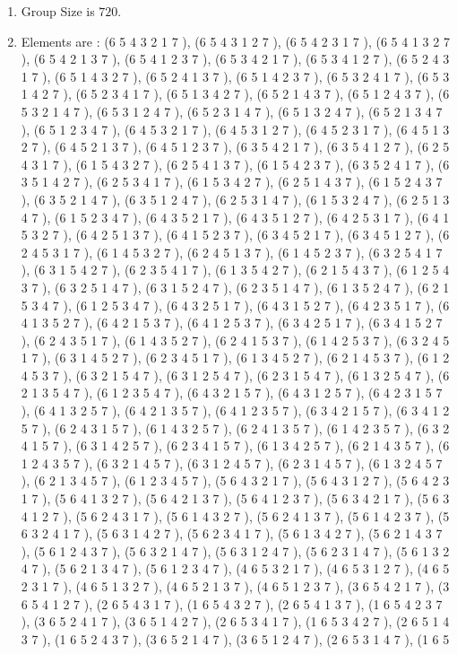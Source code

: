 \documentclass[12pt]{article}
\begin{document}
\begin{enumerate}
\item Group Size is $720$.
\item Elements are : (6 5 4 3 2 1 7  ), (6 5 4 3 1 2 7  ), (6 5 4 2 3 1 7  ), (6 5 4 1 3 2 7  ), (6 5 4 2 1 3 7  ), (6 5 4 1 2 3 7  ), (6 5 3 4 2 1 7  ), (6 5 3 4 1 2 7  ), (6 5 2 4 3 1 7  ), (6 5 1 4 3 2 7  ), (6 5 2 4 1 3 7  ), (6 5 1 4 2 3 7  ), (6 5 3 2 4 1 7  ), (6 5 3 1 4 2 7  ), (6 5 2 3 4 1 7  ), (6 5 1 3 4 2 7  ), (6 5 2 1 4 3 7  ), (6 5 1 2 4 3 7  ), (6 5 3 2 1 4 7  ), (6 5 3 1 2 4 7  ), (6 5 2 3 1 4 7  ), (6 5 1 3 2 4 7  ), (6 5 2 1 3 4 7  ), (6 5 1 2 3 4 7  ), (6 4 5 3 2 1 7  ), (6 4 5 3 1 2 7  ), (6 4 5 2 3 1 7  ), (6 4 5 1 3 2 7  ), (6 4 5 2 1 3 7  ), (6 4 5 1 2 3 7  ), (6 3 5 4 2 1 7  ), (6 3 5 4 1 2 7  ), (6 2 5 4 3 1 7  ), (6 1 5 4 3 2 7  ), (6 2 5 4 1 3 7  ), (6 1 5 4 2 3 7  ), (6 3 5 2 4 1 7  ), (6 3 5 1 4 2 7  ), (6 2 5 3 4 1 7  ), (6 1 5 3 4 2 7  ), (6 2 5 1 4 3 7  ), (6 1 5 2 4 3 7  ), (6 3 5 2 1 4 7  ), (6 3 5 1 2 4 7  ), (6 2 5 3 1 4 7  ), (6 1 5 3 2 4 7  ), (6 2 5 1 3 4 7  ), (6 1 5 2 3 4 7  ), (6 4 3 5 2 1 7  ), (6 4 3 5 1 2 7  ), (6 4 2 5 3 1 7  ), (6 4 1 5 3 2 7  ), (6 4 2 5 1 3 7  ), (6 4 1 5 2 3 7  ), (6 3 4 5 2 1 7  ), (6 3 4 5 1 2 7  ), (6 2 4 5 3 1 7  ), (6 1 4 5 3 2 7  ), (6 2 4 5 1 3 7  ), (6 1 4 5 2 3 7  ), (6 3 2 5 4 1 7  ), (6 3 1 5 4 2 7  ), (6 2 3 5 4 1 7  ), (6 1 3 5 4 2 7  ), (6 2 1 5 4 3 7  ), (6 1 2 5 4 3 7  ), (6 3 2 5 1 4 7  ), (6 3 1 5 2 4 7  ), (6 2 3 5 1 4 7  ), (6 1 3 5 2 4 7  ), (6 2 1 5 3 4 7  ), (6 1 2 5 3 4 7  ), (6 4 3 2 5 1 7  ), (6 4 3 1 5 2 7  ), (6 4 2 3 5 1 7  ), (6 4 1 3 5 2 7  ), (6 4 2 1 5 3 7  ), (6 4 1 2 5 3 7  ), (6 3 4 2 5 1 7  ), (6 3 4 1 5 2 7  ), (6 2 4 3 5 1 7  ), (6 1 4 3 5 2 7  ), (6 2 4 1 5 3 7  ), (6 1 4 2 5 3 7  ), (6 3 2 4 5 1 7  ), (6 3 1 4 5 2 7  ), (6 2 3 4 5 1 7  ), (6 1 3 4 5 2 7  ), (6 2 1 4 5 3 7  ), (6 1 2 4 5 3 7  ), (6 3 2 1 5 4 7  ), (6 3 1 2 5 4 7  ), (6 2 3 1 5 4 7  ), (6 1 3 2 5 4 7  ), (6 2 1 3 5 4 7  ), (6 1 2 3 5 4 7  ), (6 4 3 2 1 5 7  ), (6 4 3 1 2 5 7  ), (6 4 2 3 1 5 7  ), (6 4 1 3 2 5 7  ), (6 4 2 1 3 5 7  ), (6 4 1 2 3 5 7  ), (6 3 4 2 1 5 7  ), (6 3 4 1 2 5 7  ), (6 2 4 3 1 5 7  ), (6 1 4 3 2 5 7  ), (6 2 4 1 3 5 7  ), (6 1 4 2 3 5 7  ), (6 3 2 4 1 5 7  ), (6 3 1 4 2 5 7  ), (6 2 3 4 1 5 7  ), (6 1 3 4 2 5 7  ), (6 2 1 4 3 5 7  ), (6 1 2 4 3 5 7  ), (6 3 2 1 4 5 7  ), (6 3 1 2 4 5 7  ), (6 2 3 1 4 5 7  ), (6 1 3 2 4 5 7  ), (6 2 1 3 4 5 7  ), (6 1 2 3 4 5 7  ), (5 6 4 3 2 1 7  ), (5 6 4 3 1 2 7  ), (5 6 4 2 3 1 7  ), (5 6 4 1 3 2 7  ), (5 6 4 2 1 3 7  ), (5 6 4 1 2 3 7  ), (5 6 3 4 2 1 7  ), (5 6 3 4 1 2 7  ), (5 6 2 4 3 1 7  ), (5 6 1 4 3 2 7  ), (5 6 2 4 1 3 7  ), (5 6 1 4 2 3 7  ), (5 6 3 2 4 1 7  ), (5 6 3 1 4 2 7  ), (5 6 2 3 4 1 7  ), (5 6 1 3 4 2 7  ), (5 6 2 1 4 3 7  ), (5 6 1 2 4 3 7  ), (5 6 3 2 1 4 7  ), (5 6 3 1 2 4 7  ), (5 6 2 3 1 4 7  ), (5 6 1 3 2 4 7  ), (5 6 2 1 3 4 7  ), (5 6 1 2 3 4 7  ), (4 6 5 3 2 1 7  ), (4 6 5 3 1 2 7  ), (4 6 5 2 3 1 7  ), (4 6 5 1 3 2 7  ), (4 6 5 2 1 3 7  ), (4 6 5 1 2 3 7  ), (3 6 5 4 2 1 7  ), (3 6 5 4 1 2 7  ), (2 6 5 4 3 1 7  ), (1 6 5 4 3 2 7  ), (2 6 5 4 1 3 7  ), (1 6 5 4 2 3 7  ), (3 6 5 2 4 1 7  ), (3 6 5 1 4 2 7  ), (2 6 5 3 4 1 7  ), (1 6 5 3 4 2 7  ), (2 6 5 1 4 3 7  ), (1 6 5 2 4 3 7  ), (3 6 5 2 1 4 7  ), (3 6 5 1 2 4 7  ), (2 6 5 3 1 4 7  ), (1 6 5 
\end{enumerate}
\end{document}
